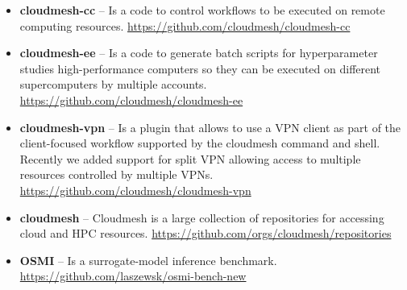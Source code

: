 \documentclass[utf8]{FrontiersinVancouver} %
\begin{document}
\begin{itemize}

\item {\bf cloudmesh-cc} -- Is a code to control workflows to be executed on
  remote computing
  resources. \url{https://github.com/cloudmesh/cloudmesh-cc}

\item {\bf cloudmesh-ee} -- Is a code to generate batch scripts for
  hyperparameter studies high-performance computers so they can be
  executed on different supercomputers by multiple
  accounts. \url{https://github.com/cloudmesh/cloudmesh-ee}


\item {\bf cloudmesh-vpn} -- Is a plugin that allows to use a VPN client as part of the client-focused workflow supported by the cloudmesh command and shell. Recently we added support for split VPN allowing access to multiple resources controlled by multiple VPNs.
\url{https://github.com/cloudmesh/cloudmesh-vpn}

\item {\bf cloudmesh} -- Cloudmesh is a large collection of repositories for
  accessing cloud and HPC
  resources. \url{https://github.com/orgs/cloudmesh/repositories}

\item {\bf OSMI} -- Is a surrogate-model inference benchmark. \url{https://github.com/laszewsk/osmi-bench-new}



\end{itemize}







% 



\end{document}

